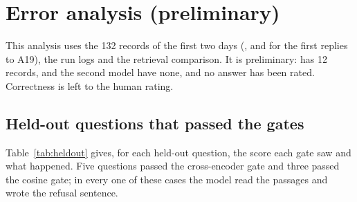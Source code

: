 \section{Error analysis (preliminary)}
\label{sec:errors}

This analysis uses the 132 records of the first two days (, and  for the first replies to A19), the run logs and the retrieval comparison. It is preliminary:  has 12 records,  and the second model have none, and no answer has been rated. Correctness is left to the human rating. 

\subsection{Held-out questions that passed the gates}

Table~\ref{tab:heldout} gives, for each held-out question, the score each gate saw and what happened. Five questions passed the cross-encoder gate and three passed the cosine gate; in every one of these cases the model read the passages and wrote the refusal sentence.

